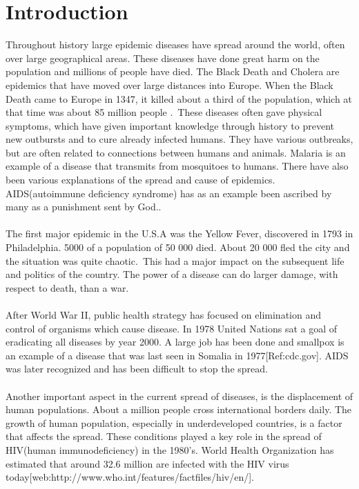 \documentclass[%
twoside,                 %
final,                   %
chapterprefix=true,      %
open=right               %
10pt]{book}
\begin{document}
\section{Introduction}
Throughout history large epidemic diseases have spread around the world, often over large geographical areas. These diseases have done great harm on the population and millions of people have died. The Black Death and Cholera are epidemics that have moved over large distances into Europe. When the Black Death came to Europe in 1347, it killed about a third of the population, which at that time was about 85 million people \cite[p.~315]{murray2002mathematical}.~These diseases often gave physical symptoms, which have given important knowledge through history to prevent new outbursts and to cure already infected humans. They have various outbreaks, but are often related to connections between humans and animals. Malaria is an example of a disease that transmits from mosquitoes to humans. There have also been various explanations of the spread and cause of epidemics. AIDS(autoimmune deficiency syndrome) has as an example been ascribed by many as a punishment sent by God.\cite[p.~316]{murray2002mathematical}.~
\\
\\
The first major epidemic in the U.S.A was the Yellow Fever, discovered in 1793 in Philadelphia. 5000 of a population of 50 000 died. About 20 000 fled the city and the situation was quite chaotic\cite[p.~316]{murray2002mathematical}.~This had a major impact on the subsequent life and politics of the country. The power of a disease can do larger damage, with respect to death, than a war.
\\
\\
After World War II, public health strategy has focused on elimination and control of organisms which cause disease. In 1978 United Nations sat a goal of eradicating all diseases by year 2000. A large job has been done and smallpox is an example of a disease that was last seen in Somalia in 1977[Ref:cdc.gov]. AIDS was later recognized and has been difficult to stop the spread.
\\
\\
Another important aspect in the current spread of diseases, is the displacement of human populations. About a million people cross international borders daily. The growth of human population, especially in underdeveloped countries, is a factor that affects the spread. These conditions played a key role in the spread of HIV(human immunodeficiency) in the 1980's. World Health Organization has estimated that around 32.6 million are infected with the HIV virus today[web:http://www.who.int/features/factfiles/hiv/en/].
\end{document}
